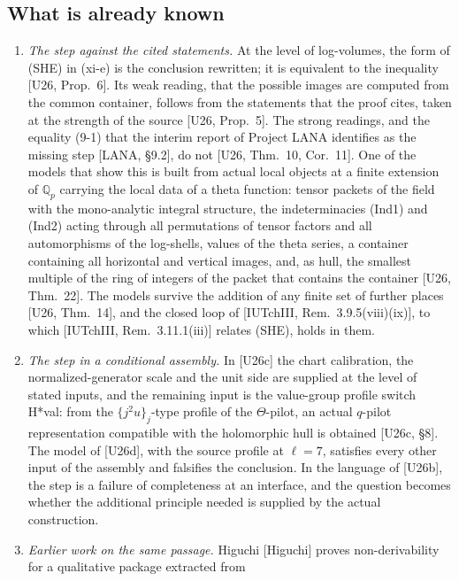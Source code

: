 \documentclass[11pt]{article}
\theoremstyle{definition}
\begin{document}
\subsection{What is already known}\label{ss:known}

\begin{enumerate}[label=(K\arabic*),leftmargin=*]
\item \emph{The step against the cited statements.}  At the level of
log-volumes, the form of (SHE) in (xi-e) is the conclusion
rewritten; it is equivalent to the inequality [U26, Prop.~6].  Its
weak reading, that the possible images are computed from the common
container, follows from the statements that the proof cites, taken
at the strength of the source [U26, Prop.~5].  The strong readings,
and the equality (9-1) that the interim report of Project LANA
identifies as the missing step [LANA, \S9.2], do not
[U26, Thm.~10, Cor.~11].  One of the models that show this is built
from actual local objects at a finite extension of $\mathbb Q_p$ carrying
the local data of a theta function: tensor packets of the field
with the mono-analytic integral structure, the indeterminacies
(Ind1) and (Ind2) acting through all permutations of tensor factors
and all automorphisms of the log-shells, values of the theta
series, a container containing all horizontal and vertical images,
and, as hull, the smallest multiple of the ring of integers of the
packet that contains the container [U26, Thm.~22].  The models
survive the addition of any finite set of further places [U26, Thm.~14],
and the closed loop of [IUTchIII, Rem.~3.9.5(viii)(ix)], to which
[IUTchIII, Rem.~3.11.1(iii)] relates (SHE), holds in them.
\item \emph{The step in a conditional assembly.}  In [U26c] the chart
calibration, the normalized-generator scale and the unit side are
supplied at the level of stated inputs, and the remaining input is
the value-group profile switch H*val: from the
$\{j^2u\}_j$-type profile of the $\Theta$-pilot, an actual $q$-pilot
representation compatible with the holomorphic hull is obtained
[U26c, \S8].  The model of [U26d], with the source profile at
$\ell=7$, satisfies every other input of the assembly and falsifies
the conclusion.  In the language of [U26b], the step is a failure
of completeness at an interface, and the question becomes whether
the additional principle needed is supplied by the actual
construction.
\item \emph{Earlier work on the same passage.}  Higuchi [Higuchi]
proves non-derivability for a qualitative package extracted from

\end{enumerate}
\end{document}
